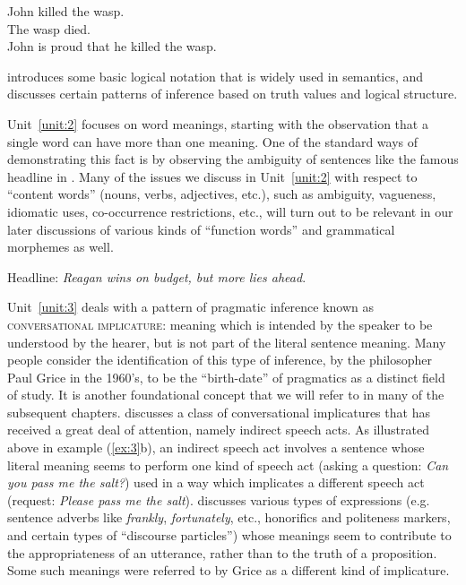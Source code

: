 \ea \label{ex:4}
\ea John killed the wasp.\\
\ex The wasp died.\\
\ex John is proud that he killed the wasp.
                       \z
\z


 introduces some basic logical notation that is widely used in semantics, and discusses certain patterns of inference based on truth values and logical structure.



Unit~\ref{unit:2} focuses on word meanings, starting with the observation that a single word can have more than one meaning. One of the standard ways of demonstrating this fact is by observing the ambiguity of sentences like the famous headline in . Many of the issues we discuss in Unit~\ref{unit:2} with respect to “content words” (nouns, verbs, adjectives, etc.), such as ambiguity, vagueness, idiomatic uses, co-occurrence restrictions, etc., will turn out to be relevant in our later discussions of various kinds of “function words” and grammatical morphemes as well.


\ea \label{ex:5}
Headline: \textit{Reagan wins on budget, but more lies ahead}.
\z


Unit~\ref{unit:3} deals with a pattern of pragmatic inference known as \textsc{conversational implicature}: meaning which is intended by the speaker to be understood by the hearer, but is not part of the literal sentence meaning. Many people consider the identification of this type of inference, by the philosopher Paul Grice in the 1960’s, to be the “birth-date” of pragmatics as a distinct field of study. It is another foundational concept that we will refer to in many of the subsequent chapters.  discusses a class of conversational implicatures that has received a great deal of attention, namely indirect speech acts. As illustrated above in example (\ref{ex:3}b), an indirect speech act involves a sentence whose literal meaning seems to perform one kind of speech act (asking a question: \textit{Can you pass me the salt?}) used in a way which implicates a different speech act (request: \textit{Please pass me the salt}).  discusses various types of expressions (e.g. sentence adverbs like \textit{frankly}, \textit{fortunately}, etc., honorifics and politeness markers, and certain types of “discourse particles”) whose meanings seem to contribute to the appropriateness of an utterance, rather than to the truth of a proposition. Some such meanings were referred to by Grice as a different kind of implicature.



